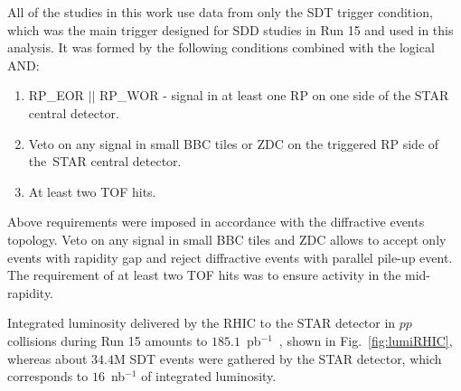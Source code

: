 All of the studies in this work use data from only the SDT trigger condition, which was the main trigger designed for SDD studies in Run 15 and used in this analysis. It was formed by the following conditions combined with the logical AND:
\begin{enumerate}
	\item RP\_EOR $||$ RP\_WOR - signal in at least one RP on one side of the STAR central detector.
	\item Veto on any signal in small BBC tiles or ZDC on the triggered RP  side of the~STAR central detector.
	\item At least two TOF hits.
\end{enumerate}
Above requirements were imposed in accordance with the diffractive events topology. Veto on any signal in small BBC tiles and ZDC allows to accept only events with rapidity gap and reject diffractive events with parallel pile-up event. The requirement of at least two TOF hits was to ensure activity in the mid-rapidity.

Integrated luminosity delivered by the RHIC to the STAR detector in $pp$ collisions during Run 15 amounts to $185.1$~pb$^{-1}$~\cite{RHIC:rhicRunLuminosity}, shown in Fig.~\ref{fig:lumiRHIC}, whereas about $34.4$M SDT events were gathered by the STAR detector, which corresponds to $16$~nb$^{-1}$ of integrated luminosity.
